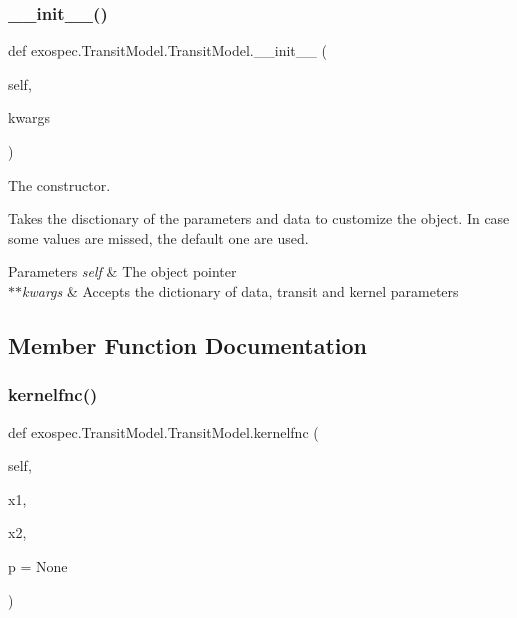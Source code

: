 \subsubsection{\texorpdfstring{\+\_\+\+\_\+init\+\_\+\+\_\+()}{\_\_init\_\_()}}
{\footnotesize\ttfamily def exospec.\+Transit\+Model.\+Transit\+Model.\+\_\+\+\_\+init\+\_\+\+\_\+ (\begin{DoxyParamCaption}\item[{}]{self,  }\item[{}]{kwargs }\end{DoxyParamCaption})}



The constructor. 

Takes the disctionary of the parameters and data to customize the object. In case some values are missed, the default one are used. 
\begin{DoxyParams}{Parameters}
{\em self} & The object pointer \\
\hline
{\em $\ast$$\ast$kwargs} & Accepts the dictionary of data, transit and kernel parameters \\
\hline
\end{DoxyParams}


\subsection{Member Function Documentation}
\mbox{\label{classexospec_1_1_transit_model_1_1_transit_model_a4e41db96fc3b1b134bfce74aad263b50}} 
\subsubsection{\texorpdfstring{kernelfnc()}{kernelfnc()}}
{\footnotesize\ttfamily def exospec.\+Transit\+Model.\+Transit\+Model.\+kernelfnc (\begin{DoxyParamCaption}\item[{}]{self,  }\item[{}]{x1,  }\item[{}]{x2,  }\item[{}]{p = {\ttfamily None} }\end{DoxyParamCaption})}



